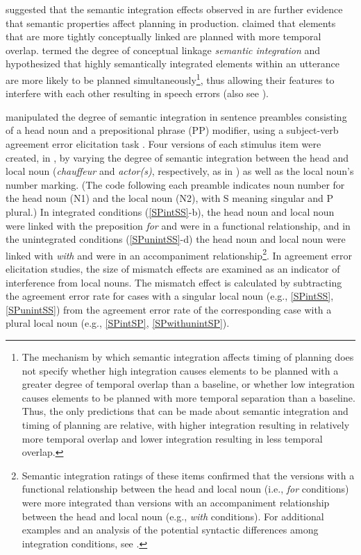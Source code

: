 \documentclass[12pt,titlepage]{article}
\newcommand{\IGNORE}[1]{} %
\begin{document}
 suggested that the semantic integration effects
observed in  are further evidence that
semantic properties affect planning in production.
\citeauthor{SolomonPearlmutter04} claimed that elements that are more
tightly conceptually linked are planned with more temporal
overlap\IGNORE{ during grammatical encoding, increasing their chance
of interfering with each other and resulting in subject-verb agreement
errors}.  \citeauthor{SolomonPearlmutter04} termed the degree of
conceptual linkage \textit{semantic integration} and hypothesized that
highly semantically integrated elements within an utterance are more
likely to be planned simultaneously\footnote{The mechanism by which
semantic integration affects timing of planning does not specify
whether high integration causes elements to be planned with a greater
degree of temporal overlap than a baseline, or whether low integration
causes elements to be planned with more temporal separation than a
baseline.  Thus, the only predictions that can be made about semantic
integration and timing of planning are relative, with higher
integration resulting in relatively more temporal overlap and lower
integration resulting in less temporal overlap.}, thus allowing their
features to interfere with each other resulting in speech errors (also
see ).

 manipulated the degree of semantic
integration in sentence preambles consisting of a head noun and a
prepositional phrase (PP) modifier, using a subject-verb agreement
error elicitation task \cite{BockMiller91}.  Four versions of each
stimulus item were created, in , by varying the degree of
semantic integration between the head and local noun
(\textit{chauffeur} and \textit{actor(s)}, respectively, as in
) as well as the local noun's number marking.  (The code
following each preamble indicates noun number for the head noun (N1)
and the local noun (N2), with S meaning singular and P plural.)  In
integrated conditions (\ref{SPintSS}-b), the head noun and local noun
were linked with the preposition \textit{for} and were in a functional
relationship, and in the unintegrated conditions (\ref{SPunintSS}-d)
the head noun and local noun were linked with \textit{with} and were
in an accompaniment relationship\footnote{Semantic integration ratings
of these items confirmed that the versions with a functional
relationship between the head and local noun (i.e., \textit{for}
conditions) were more integrated than versions with an accompaniment
relationship between the head and local noun (e.g., \textit{with}
conditions).  For additional examples and an analysis of the potential
syntactic differences among integration conditions, see
.}.  In agreement error elicitation
studies, the size of mismatch effects are examined as an indicator of
interference from local nouns.  The mismatch effect is calculated by
subtracting the agreement error rate for cases with a singular local
noun (e.g., \ref{SPintSS}, \ref{SPunintSS}) from the agreement error
rate of the corresponding case with a plural local noun (e.g.,
\ref{SPintSP}, \ref{SPwithunintSP}).
  
\end{document}
